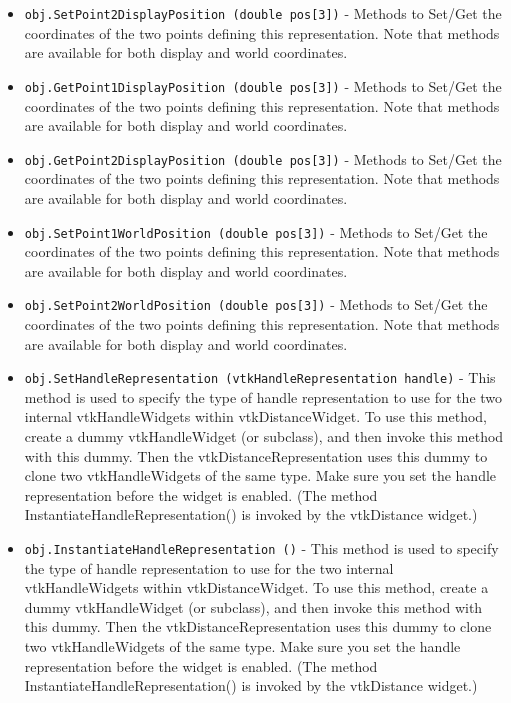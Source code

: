 \begin{itemize}
\item  \verb|obj.SetPoint2DisplayPosition (double pos[3])| -  Methods to Set/Get the coordinates of the two points defining
 this representation. Note that methods are available for both
 display and world coordinates.

\item  \verb|obj.GetPoint1DisplayPosition (double pos[3])| -  Methods to Set/Get the coordinates of the two points defining
 this representation. Note that methods are available for both
 display and world coordinates.

\item  \verb|obj.GetPoint2DisplayPosition (double pos[3])| -  Methods to Set/Get the coordinates of the two points defining
 this representation. Note that methods are available for both
 display and world coordinates.

\item  \verb|obj.SetPoint1WorldPosition (double pos[3])| -  Methods to Set/Get the coordinates of the two points defining
 this representation. Note that methods are available for both
 display and world coordinates.

\item  \verb|obj.SetPoint2WorldPosition (double pos[3])| -  Methods to Set/Get the coordinates of the two points defining
 this representation. Note that methods are available for both
 display and world coordinates.

\item  \verb|obj.SetHandleRepresentation (vtkHandleRepresentation handle)| -  This method is used to specify the type of handle representation to
 use for the two internal vtkHandleWidgets within vtkDistanceWidget.
 To use this method, create a dummy vtkHandleWidget (or subclass),
 and then invoke this method with this dummy. Then the 
 vtkDistanceRepresentation uses this dummy to clone two vtkHandleWidgets
 of the same type. Make sure you set the handle representation before
 the widget is enabled. (The method InstantiateHandleRepresentation()
 is invoked by the vtkDistance widget.)

\item  \verb|obj.InstantiateHandleRepresentation ()| -  This method is used to specify the type of handle representation to
 use for the two internal vtkHandleWidgets within vtkDistanceWidget.
 To use this method, create a dummy vtkHandleWidget (or subclass),
 and then invoke this method with this dummy. Then the 
 vtkDistanceRepresentation uses this dummy to clone two vtkHandleWidgets
 of the same type. Make sure you set the handle representation before
 the widget is enabled. (The method InstantiateHandleRepresentation()
 is invoked by the vtkDistance widget.)


\end{itemize}
